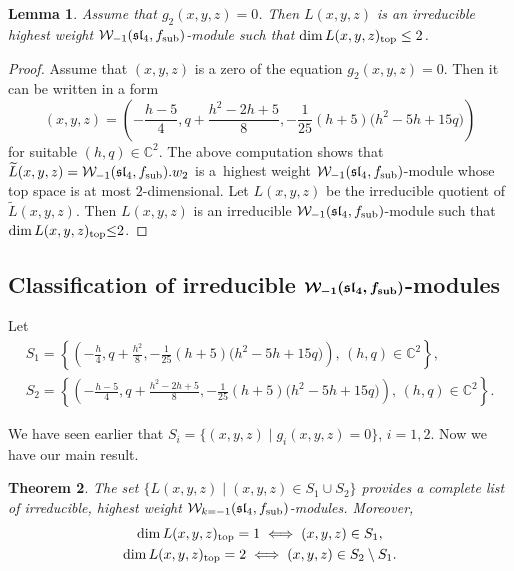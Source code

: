 \documentclass[pdftex]{sigma}
\numberwithin{equation}{section}
\newcommand{\C}{\mathbb C}
\newtheorem{Theorem}{Theorem}[section]
\newtheorem{Lemma}[Theorem]{Lemma}
\begin{document}
\begin{Lemma} \label{konstr-2}
Assume that
$g_2(x,y,z) = 0$. Then $L(x,y,z)$ is an irreducible highest weight $\mathcal{W}_{-1}(\mathfrak{sl}_4, f_{\rm sub})$-module such that $\dim L(x,y,z)_{\rm top} \le 2$.
\end{Lemma}
\begin{proof}
 Assume that $(x,y, z)$ is a zero of the equation $g_2(x,y,z) = 0$. Then it can be written in a form
\[
 (x,y,z) = \left(-\frac{h-5}{4}, q+ \frac{h^2 - 2 h + 5}{8}, -\frac{1}{25} (h+5) \bigl(h^2 - 5h + 15 q\bigr)\right)
 \]
for suitable
$(h,q) \in {\C} ^2$. The above computation shows that
$
\widetilde L(x,y,z) = \mathcal W_{-1} (\mathfrak{sl}_4, f_{\rm sub}). w_2
$
is a~highest weight $\mathcal W_{-1} (\mathfrak{sl}_4, f_{\rm sub})$-module whose top space is at most $2$-dimensional. Let $L(x,y,z)$ be the irreducible quotient of $\widetilde L(x,y,z)$. Then $L(x,y,z)$ is an irreducible $\mathcal W_{-1} (\mathfrak{sl}_4, f_{\rm sub})$-module such that $\dim L(x,y,z)_{\rm top} { \le } 2$.
\end{proof}

\subsection[Classification of irreducible W\_-1(sl\_4, f\_sub)-modules]{Classification of irreducible $\boldsymbol{\mathcal{W}_{-1}(\mathfrak{sl}_4, f_{\rm sub})}$-modules}

 Let
\begin{gather*}
 S_{1} = \left\{ \left(-\frac{h}{4}, q+ \frac{h^2}{8}, -\frac{1}{25} (h+5) \bigl(h^2 - 5h + 15 q\bigr)\right),\, (h,q) \in {\C} ^2\right\}, \\
 S_{2} = \left\{ \left(-\frac{h{-}5}{4}, q+ \frac{h^2 - 2 h + 5}{8}, -\frac{1}{25} (h+5) \bigl(h^2 - 5h + 15 q\bigr)\right), \,(h,q) \in {\C} ^2\right\} .
\end{gather*}


We have seen earlier that $S_i = \{ (x,y,z) \mid g_i (x,y,z) =0\}$, $i=1,2$. Now we have our main result.

\begin{Theorem} \label{klas-1}
The set $\{L(x,y,z) \mid (x,y,z) \in S_1 \cup S_2 \}$ provides a complete list of irreducible, highest weight $\mathcal{W}_{k=-1}(\mathfrak{sl}_4, f_{\rm sub})$-modules. Moreover,
\begin{gather*}
 \dim L(x,y,z)_{\rm top} = 1 \iff (x,y,z) \in S_1, \\ \dim L(x,y,z)_{\rm top} = 2 \iff (x,y,z) \in S_2 \setminus S_1.
 \end{gather*}
\end{Theorem}
\end{document}
